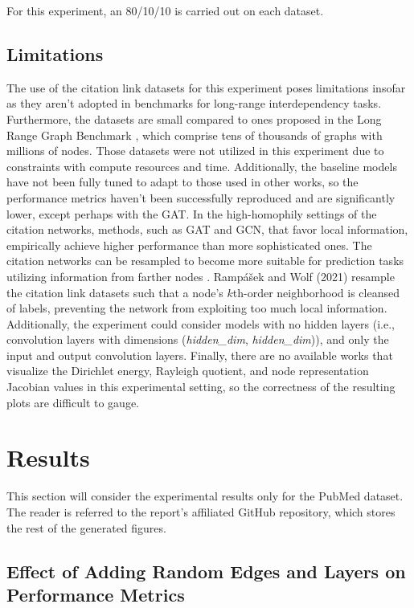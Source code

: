 \documentclass[11pt]{article}
\begin{document}
For this experiment, an 80/10/10 is carried out on each dataset.

\subsection{Limitations}

The use of the citation link datasets for this experiment poses limitations insofar as they aren't adopted in benchmarks for long-range interdependency tasks. Furthermore, the datasets are small compared to ones proposed in the Long Range Graph Benchmark \cite{https://doi.org/10.48550/arxiv.2206.08164}, which comprise tens of thousands of graphs with millions of nodes. Those datasets were not utilized in this experiment due to constraints with compute resources and time. Additionally, the baseline models have not been fully tuned to adapt to those used in other works, so the performance metrics haven't been successfully reproduced and are significantly lower, except perhaps with the GAT. In the high-homophily settings of the citation networks, methods, such as GAT and GCN, that favor local information, empirically achieve higher performance than more sophisticated ones. The citation networks can be resampled to become more suitable for prediction tasks utilizing information from farther nodes \cite{https://doi.org/10.48550/arxiv.2107.07432}. Rampášek and Wolf (2021) resample the citation link datasets such that a node's $k$th-order neighborhood is cleansed of labels, preventing the network from exploiting too much local information. Additionally, the experiment could consider models with no hidden layers (i.e., convolution layers with dimensions (\textit{hidden\_dim}, \textit{hidden\_dim})), and only the input and output convolution layers. Finally, there are no available works that visualize the Dirichlet energy, Rayleigh quotient, and node representation Jacobian values in this experimental setting, so the correctness of the resulting plots are difficult to gauge.  


\section{Results}

This section will consider the experimental results only for the PubMed dataset. The reader is referred to the report's affiliated GitHub repository, which stores the rest of the generated figures.

\subsection{Effect of Adding Random Edges and Layers on Performance Metrics}
\end{document}
